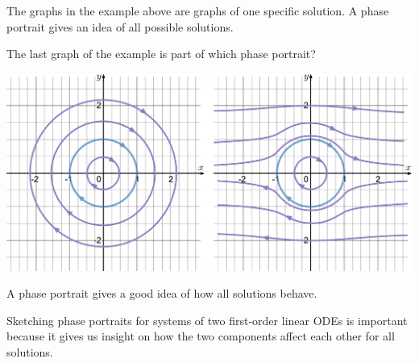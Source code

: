 The graphs in the example above are graphs of one specific solution. A phase portrait gives an idea of all possible solutions. 
\begin{example}
The last graph of the example is part of which phase portrait?

\begin{center}
\includegraphics*[width=420pt]{images/module17-possiblephaseportraits.pdf}
\end{center}

A phase portrait gives a good idea of how all solutions behave.
\end{example}

Sketching phase portraits for systems of two first-order linear ODEs is important because it gives us insight on how the two components affect each other for all solutions.

